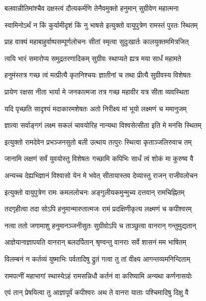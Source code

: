 \twolineshloka
{बलवान्नीतिमांश्चैव दक्षस्त्वं दौत्यकर्मणि}
{तेनैवमुक्तो हनुमान् सुग्रीवेण महात्मना} %

\twolineshloka
{स्वामिनोऽर्थं न किं कुर्यामीदृशं किं नु भाषसे}
{इत्युक्तो वायुपुत्रेण रामस्तं पुरतः स्थितम्} %

\twolineshloka
{प्राह वाक्यं महाबाहुर्वाष्पसम्पूर्णलोचनः}
{सीतां स्मृत्वा सुदुःखार्तः कालयुक्तममित्रजित्} %

\twolineshloka
{त्वयि भारं समारोप्य समुद्रतरणादिकम्}
{सुग्रीवः स्थाप्यते ह्यत्र मया सार्धं महामते} %

\twolineshloka
{हनुमंस्तत्र गच्छ त्वं मत्प्रीत्यै कृतनिश्चयः}
{ज्ञातीनां च तथा प्रीत्यै सुग्रीवस्य विशेषतः} %

\twolineshloka
{प्रायेण रक्षसा नीता भार्या मे जनकात्मजा}
{तत्र गच्छ महावीर यत्र सीता व्यवस्थिता} %

\twolineshloka
{यदि पृच्छति सादृश्यं मदाकारमशेषतः}
{अतो निरीक्ष्य मां भूयो लक्ष्मणं च ममानुजम्} %

\twolineshloka
{ज्ञात्वा सर्वाङ्गगं लक्ष्म सकलं चावयोरिह}
{नान्यथा विश्वसेत्सीता इति मे मनसि स्थितम्} %

\twolineshloka
{इत्युक्तो रामदेवेन प्रभञ्जनसुतो बली}
{उत्थाय तत्पुरः स्थित्वा कृताञ्जलिरुवाच तम्} %

\twolineshloka
{जानामि लक्षणं सर्वं युवयोस्तु विशेषतः}
{गच्छामि कपिभिः सार्धं त्वं शोकं मा कुरुष्व वै} %

\twolineshloka
{अन्यच्च देह्यभिज्ञानं विश्वासो येन मे भवेत्}
{सीतायास्तव देव्यास्तु राजन् राजीवलोचन} %

\twolineshloka
{इत्युक्तो वायुपुत्रेण रामः कमललोचनः}
{अङ्गुलीयकमुन्मुच्य दत्तवान् रामचिह्नितम्} %

\twolineshloka
{तदगृहीत्वा तदा सोऽपि हनुमान्मारुतात्मजः}
{रामं प्रदक्षिणीकृत्य लक्ष्मणं च कपीश्वरम्} %

\twolineshloka
{नत्वा ततो जगामाशु हनुमानञ्जनीसुतः}
{सुग्रीवोऽपि च ताञ्छुत्वा वानरान् गन्तुमुद्यतान्} %

\twolineshloka
{आज्ञेयानाज्ञापयति वानरान् बलदर्पितान्}
{श्रृण्वन्तु वानराः सर्वे शासनं मम भाषितम्} %

\twolineshloka
{विलम्बनं न कर्तव्यं युष्माभिः पर्वतादिषु}
{द्रुतं गत्वा तु तां वीक्ष्य आगन्तव्यमनिन्दिताम्} %

\twolineshloka
{रामपत्नीं महाभागां स्थास्येऽहं रामसन्निधौ}
{कर्तनं वा करिष्यामि अन्यथा कर्णनासयोः} %

\twolineshloka
{एवं तान् प्रेषयित्वा तु आज्ञापूर्वं कपीश्वरः}
{अथ ते वानरा याताः पश्चिमादिषु दिक्षु वै} %

